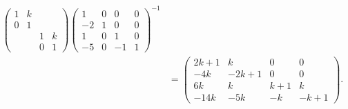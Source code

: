 \documentclass[../../main.tex]{subfiles}%
\begin{document}
\begin{solution}
\begin{align*}
\begin{pmatrix}
1 & k & & \\
0 & 1 & & \\
    & & 1 & k \\
    & & 0 & 1
\end{pmatrix}
\begin{pmatrix}
1 & 0 & 0 & 0 \\
-2 & 1 & 0 & 0 \\
1 & 0 & 1 & 0 \\
-5 & 0 & -1 & 1
\end{pmatrix}^{-1} \\
&=
\begin{pmatrix}
2k + 1 & k & 0 & 0 \\
-4k & -2k + 1 & 0 & 0 \\
6k & k & k + 1 & k \\
-14k & -5k & -k & -k + 1
\end{pmatrix}.
\end{align*}

\end{solution}
\end{document}
